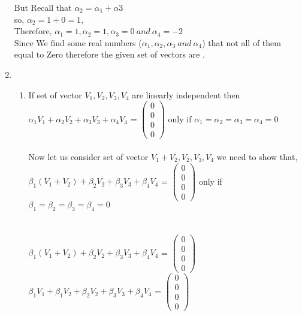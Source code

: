 \documentclass[45pt]{article}
\begin{document}
\begin{enumerate}
But Recall that $\alpha_2=\alpha_1+\alpha3$\\
so, $\alpha_2= 1+0 = 1,$ \\
Therefore, $\alpha_1=1, \alpha_2=1, \alpha_3=0~ and ~\alpha_4=-2$\\
Since We find some real numbers ($\alpha_1, \alpha_2, \alpha_3~and ~\alpha_4$) that not all of them equal to Zero therefore the given set of vectors are .\\
    
\item \begin{enumerate}
    \item If set of vector {$V_1,V_2,V_3,V_4$} are linearly independent then \\
 $\alpha_1 V_1+\alpha_2 V_2+\alpha_3 V_3+ \alpha_4 V_4$ =
$\begin{pmatrix}
0\\0\\0\\0
\end{pmatrix}
$ only if $\alpha_1 = \alpha_2 =\alpha_3= \alpha_4=0$\\\\
Now let us consider set of vector ${V_1+V_2,V_2,V_3,V_4}$
we need to show that,\\

$\beta_1 (V_1+V_2)+\beta_2 V_2+\beta_3 V_3+ \beta_4 V_4$ =
$\begin{pmatrix}
0\\0\\0\\0
\end{pmatrix}
$ 
 only if $\beta_1 = \beta_2 =\beta_3= \beta_4=0$\\\\
 
\\
$\beta_1 (V_1+V_2)+\beta_2 V_2+\beta_3 V_3+ \beta_4 V_4$ =
$\begin{pmatrix}
0\\0\\0\\0
\end{pmatrix}
$ \\

$\beta_1 V_1+ \beta_1 V_2+\beta_2 V_2+\beta_3 V_3+ \beta_4 V_4$ =
$\begin{pmatrix}
0\\0\\0\\0
\end{pmatrix}
$ 


\end{enumerate}
\end{enumerate}
\end{document}
